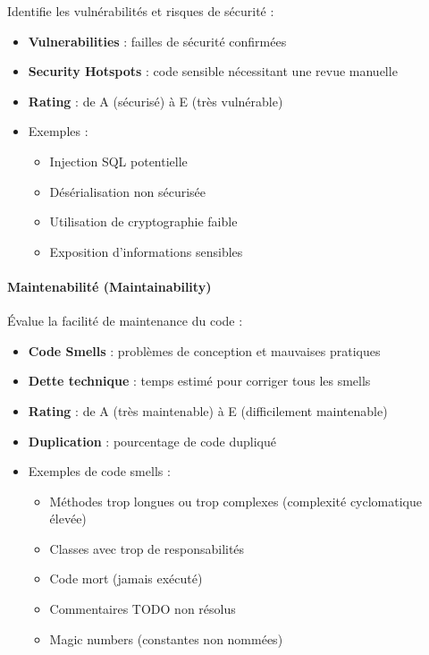Identifie les vulnérabilités et risques de sécurité :
\begin{itemize}
    \item \textbf{Vulnerabilities} : failles de sécurité confirmées
    \item \textbf{Security Hotspots} : code sensible nécessitant une revue manuelle
    \item \textbf{Rating} : de A (sécurisé) à E (très vulnérable)
    \item Exemples :
    \begin{itemize}
        \item Injection SQL potentielle
        \item Désérialisation non sécurisée
        \item Utilisation de cryptographie faible
        \item Exposition d'informations sensibles
    \end{itemize}
\end{itemize}

\paragraph{Maintenabilité (Maintainability)}

Évalue la facilité de maintenance du code :
\begin{itemize}
    \item \textbf{Code Smells} : problèmes de conception et mauvaises pratiques
    \item \textbf{Dette technique} : temps estimé pour corriger tous les smells
    \item \textbf{Rating} : de A (très maintenable) à E (difficilement maintenable)
    \item \textbf{Duplication} : pourcentage de code dupliqué
    \item Exemples de code smells :
    \begin{itemize}
        \item Méthodes trop longues ou trop complexes (complexité cyclomatique élevée)
        \item Classes avec trop de responsabilités
        \item Code mort (jamais exécuté)
        \item Commentaires TODO non résolus
        \item Magic numbers (constantes non nommées)
    \end{itemize}
\end{itemize}

